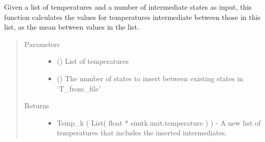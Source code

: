 \documentclass[letterpaper,12pt,english,openany,oneside]{sphinxmanual}
\begin{document}
\begin{fulllineitems}
\label{\detokenize{thermo:parameters.reweight.get_intermediate_temperatures}}
Given a list of temperatures and a number of intermediate states as input, this function calculates the values for temperatures intermediate between those in this list, as the mean between values in the list.
\begin{quote}\begin{description}
\item[{Parameters}] \leavevmode\begin{itemize}
\item {} 
 (\sphinxstyleliteralemphasis{\sphinxupquote{( }}\sphinxstyleliteralemphasis{\sphinxupquote{ )}}) \textendash{} List of temperatures

\item {} 
 () \textendash{} The number of states to insert between existing states in ‘T\_from\_file’

\end{itemize}

\item[{Returns}] \leavevmode
\begin{itemize}
\item {} 
Temp\_k ( List( float * simtk.unit.temperature ) ) - A new list of temperatures that includes the inserted intermediates.

\end{itemize}


\end{description}\end{quote}

\end{fulllineitems}

\end{document}
